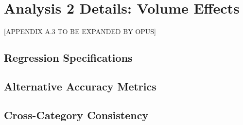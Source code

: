 \section{Analysis 2 Details: Volume Effects}
\label{sec:A3}

[APPENDIX A.3 TO BE EXPANDED BY OPUS]

\subsection{Regression Specifications}

\subsection{Alternative Accuracy Metrics}

\subsection{Cross-Category Consistency}
